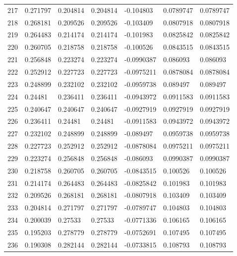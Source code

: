 \begin{longtable}{l|lll|lll}
 217 &  0.271797    & 0.204814    & 0.204814    & -0.104803    & 0.0789747   & 0.0789747   \\
 218 &  0.268181    & 0.209526    & 0.209526    & -0.103409    & 0.0807918   & 0.0807918   \\
 219 &  0.264483    & 0.214174    & 0.214174    & -0.101983    & 0.0825842   & 0.0825842   \\
 220 &  0.260705    & 0.218758    & 0.218758    & -0.100526    & 0.0843515   & 0.0843515   \\
 221 &  0.256848    & 0.223274    & 0.223274    & -0.0990387   & 0.086093    & 0.086093    \\
 222 &  0.252912    & 0.227723    & 0.227723    & -0.0975211   & 0.0878084   & 0.0878084   \\
 223 &  0.248899    & 0.232102    & 0.232102    & -0.0959738   & 0.089497    & 0.089497    \\
 224 &  0.24481     & 0.236411    & 0.236411    & -0.0943972   & 0.0911583   & 0.0911583   \\
 225 &  0.240647    & 0.240647    & 0.240647    & -0.0927919   & 0.0927919   & 0.0927919   \\
 226 &  0.236411    & 0.24481     & 0.24481     & -0.0911583   & 0.0943972   & 0.0943972   \\
 227 &  0.232102    & 0.248899    & 0.248899    & -0.089497    & 0.0959738   & 0.0959738   \\
 228 &  0.227723    & 0.252912    & 0.252912    & -0.0878084   & 0.0975211   & 0.0975211   \\
 229 &  0.223274    & 0.256848    & 0.256848    & -0.086093    & 0.0990387   & 0.0990387   \\
 230 &  0.218758    & 0.260705    & 0.260705    & -0.0843515   & 0.100526    & 0.100526    \\
 231 &  0.214174    & 0.264483    & 0.264483    & -0.0825842   & 0.101983    & 0.101983    \\
 232 &  0.209526    & 0.268181    & 0.268181    & -0.0807918   & 0.103409    & 0.103409    \\
 233 &  0.204814    & 0.271797    & 0.271797    & -0.0789747   & 0.104803    & 0.104803    \\
 234 &  0.200039    & 0.27533     & 0.27533     & -0.0771336   & 0.106165    & 0.106165    \\
 235 &  0.195203    & 0.278779    & 0.278779    & -0.0752691   & 0.107495    & 0.107495    \\
 236 &  0.190308    & 0.282144    & 0.282144    & -0.0733815   & 0.108793    & 0.108793    \\

\end{longtable}

